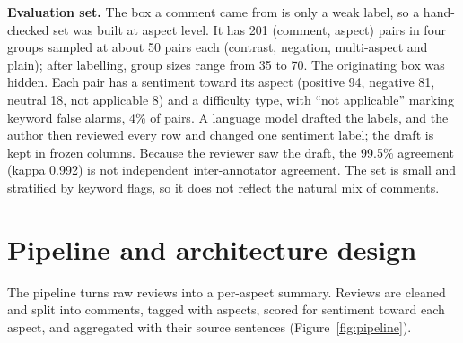 \documentclass[11pt,a4paper]{article}
\begin{document}
\textbf{Evaluation set.} The box a comment came from is only a weak label, so a hand-checked set was built at aspect level. It has 201 (comment, aspect) pairs in four groups sampled at about 50 pairs each (contrast, negation, multi-aspect and plain); after labelling, group sizes range from 35 to 70. The originating box was hidden. Each pair has a sentiment toward its aspect (positive 94, negative 81, neutral 18, not applicable 8) and a difficulty type, with ``not applicable'' marking keyword false alarms, 4\% of pairs. A language model drafted the labels, and the author then reviewed every row and changed one sentiment label; the draft is kept in frozen columns. Because the reviewer saw the draft, the 99.5\% agreement (kappa 0.992) is not independent inter-annotator agreement. The set is small and stratified by keyword flags, so it does not reflect the natural mix of comments.

\section{Pipeline and architecture design}\label{sec:pipeline}

The pipeline turns raw reviews into a per-aspect summary. Reviews are cleaned and split into comments, tagged with aspects, scored for sentiment toward each aspect, and aggregated with their source sentences (Figure~\ref{fig:pipeline}).
\end{document}
